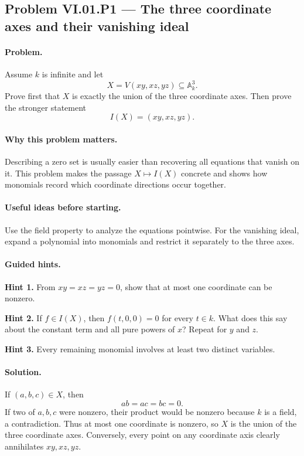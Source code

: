 \subsection*{Problem VI.01.P1 --- The three coordinate axes and their vanishing ideal}
\label{prob:vi01-p1}

\paragraph{Problem.}
Assume \(k\) is infinite and let
\[
X=V(xy,xz,yz)\subseteq\mathbb A_k^3.
\]
Prove first that \(X\) is exactly the union of the three coordinate axes.  Then prove the
stronger statement
\[
I(X)=(xy,xz,yz).
\]

\ifdefined\FullProblemDossiers
\paragraph{Why this problem matters.}
Describing a zero set is usually easier than recovering all equations that vanish on it.
This problem makes the passage \(X\mapsto I(X)\) concrete and shows how monomials record
which coordinate directions occur together.

\paragraph{Useful ideas before starting.}
Use the field property to analyze the equations pointwise.  For the vanishing ideal, expand
a polynomial into monomials and restrict it separately to the three axes.

\paragraph{Guided hints.}
\textbf{Hint 1.} From \(xy=xz=yz=0\), show that at most one coordinate can be nonzero.

\textbf{Hint 2.} If \(f\in I(X)\), then \(f(t,0,0)=0\) for every \(t\in k\).  What does
this say about the constant term and all pure powers of \(x\)?  Repeat for \(y\) and \(z\).

\textbf{Hint 3.} Every remaining monomial involves at least two distinct variables.

\paragraph{Solution.}
If \((a,b,c)\in X\), then
\[
ab=ac=bc=0.
\]
If two of \(a,b,c\) were nonzero, their product would be nonzero because \(k\) is a field,
a contradiction.  Thus at most one coordinate is nonzero, so \(X\) is the union of the
three coordinate axes.  Conversely, every point on any coordinate axis clearly annihilates
\(xy,xz,yz\).

